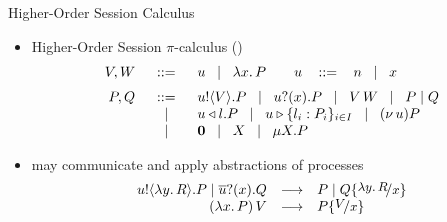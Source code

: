 \documentclass{beamer}
\begin{document}
	\begin{frame}{Higher-Order Session Calculus}
		\begin{itemize}
			\item	Higher-Order Session $\pi$-calculus (\HOp)
				\[
					\begin{array}{rcl}
						V, W &\;\;::=\;\;& u \;\;\;|\;\;\; \lambda x.\,P \qquad u\ \;\;::=\;\;\ n \;\;\;|\;\;\; x \\[2mm]
						P, Q &\;\;::=\;\;& u ! \langle V \rangle . P \;\;\;|\;\;\; u ? (x) . P \;\;\;|\;\;\; V\, {W} \;\;\;|\;\;\; P \;|\; Q \\
						&\;\;\;|\;\;\;& u \triangleleft l . P \;\;\;|\;\;\; u \triangleright \{l_i: P_i\}_{i \in I} \;\;\;|\;\;\; (\nu\, u) P \\
						&\;\;\;|\;\;\;& \mathbf{0} \;\;\;|\;\;\; X \;\;\;|\;\;\; \mu X. P
					\end{array}
				\]

			\item	\HOp may communicate and apply abstractions of processes%
				\[
					\begin{array}{rcl}
						\bout{u}{\abs{y}{R}} P \Par \binp{\dual{u}}{x} Q &\red& P \Par Q \subst{\abs{y}{R}}{x}\\
						\appl{(\abs{x}{P})}{V} &\red& P \subst{V}{x}
					\end{array}
				\]
		\end{itemize}
	\end{frame}
\end{document}
